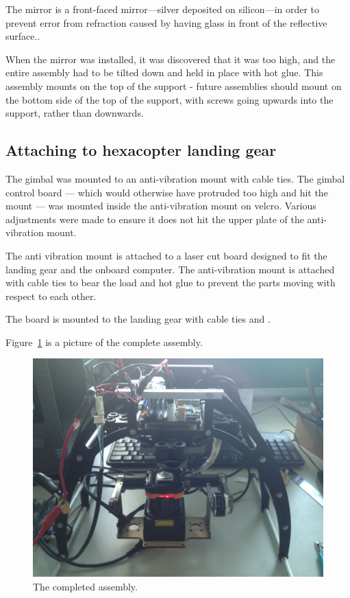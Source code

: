 \documentclass[12pt,oneside,a4paper]{book}
\begin{document}
The mirror is a front-faced mirror---silver deposited on silicon---in
order to prevent error from refraction caused by having glass in front
of the reflective surface..

When the mirror was installed, it was discovered that it was too high,
and the entire assembly had to be tilted down and held in place with
hot glue. This assembly mounts on the top of the support - future
assemblies should mount on the bottom side of the top of the support,
with screws going upwards into the support, rather than downwards.

\subsection{Attaching to hexacopter landing gear}
\label{sec:attach-hexac-land}

The gimbal was mounted to an anti-vibration mount with cable
ties. The gimbal control board --- which would otherwise have
protruded too high and hit the mount --- was mounted inside the
anti-vibration mount on velcro. Various adjustments were made to
ensure it does not hit the upper plate of the anti-vibration mount.

The anti vibration mount is attached to a laser cut board designed to
fit the landing gear and the onboard computer. The anti-vibration
mount is attached with cable ties to bear the load and hot glue to
prevent the parts moving with respect to each other.


The board is mounted to the landing gear with cable ties and .

Figure~\ref{fig:mk2} is a picture of the complete assembly.

\begin{figure}[h!]
  \centering
  \includegraphics[width=\textwidth]{figs/mk2}
  \caption{The completed assembly. }
  \label{fig:mk2}
\end{figure}
\end{document}
